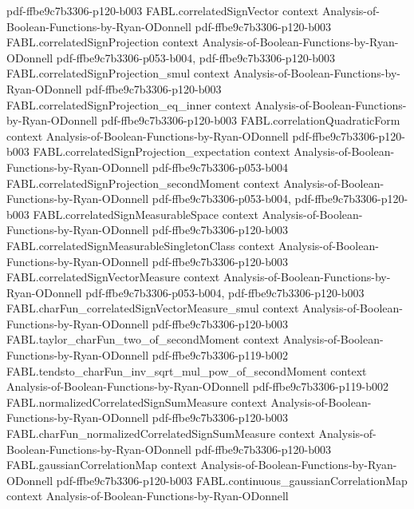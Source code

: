 \begin{theorem}
  {pdf-ffbe9c7b3306-p120-b003}
\proofstep
  {FABL.correlatedSignVector}
  {context}
  {Analysis-of-Boolean-Functions-by-Ryan-ODonnell}
  {pdf-ffbe9c7b3306-p120-b003}
\proofstep
  {FABL.correlatedSignProjection}
  {context}
  {Analysis-of-Boolean-Functions-by-Ryan-ODonnell}
  {pdf-ffbe9c7b3306-p053-b004,
    pdf-ffbe9c7b3306-p120-b003}
\proofstep
  {FABL.correlatedSignProjection_smul}
  {context}
  {Analysis-of-Boolean-Functions-by-Ryan-ODonnell}
  {pdf-ffbe9c7b3306-p120-b003}
\proofstep
  {FABL.correlatedSignProjection_eq_inner}
  {context}
  {Analysis-of-Boolean-Functions-by-Ryan-ODonnell}
  {pdf-ffbe9c7b3306-p120-b003}
\proofstep
  {FABL.correlationQuadraticForm}
  {context}
  {Analysis-of-Boolean-Functions-by-Ryan-ODonnell}
  {pdf-ffbe9c7b3306-p120-b003}
\proofstep
  {FABL.correlatedSignProjection_expectation}
  {context}
  {Analysis-of-Boolean-Functions-by-Ryan-ODonnell}
  {pdf-ffbe9c7b3306-p053-b004}
\proofstep
  {FABL.correlatedSignProjection_secondMoment}
  {context}
  {Analysis-of-Boolean-Functions-by-Ryan-ODonnell}
  {pdf-ffbe9c7b3306-p053-b004,
    pdf-ffbe9c7b3306-p120-b003}
\proofstep
  {FABL.correlatedSignMeasurableSpace}
  {context}
  {Analysis-of-Boolean-Functions-by-Ryan-ODonnell}
  {pdf-ffbe9c7b3306-p120-b003}
\proofstep
  {FABL.correlatedSignMeasurableSingletonClass}
  {context}
  {Analysis-of-Boolean-Functions-by-Ryan-ODonnell}
  {pdf-ffbe9c7b3306-p120-b003}
\proofstep
  {FABL.correlatedSignVectorMeasure}
  {context}
  {Analysis-of-Boolean-Functions-by-Ryan-ODonnell}
  {pdf-ffbe9c7b3306-p053-b004,
    pdf-ffbe9c7b3306-p120-b003}
\proofstep
  {FABL.charFun_correlatedSignVectorMeasure_smul}
  {context}
  {Analysis-of-Boolean-Functions-by-Ryan-ODonnell}
  {pdf-ffbe9c7b3306-p120-b003}
\proofstep
  {FABL.taylor_charFun_two_of_secondMoment}
  {context}
  {Analysis-of-Boolean-Functions-by-Ryan-ODonnell}
  {pdf-ffbe9c7b3306-p119-b002}
\proofstep
  {FABL.tendsto_charFun_inv_sqrt_mul_pow_of_secondMoment}
  {context}
  {Analysis-of-Boolean-Functions-by-Ryan-ODonnell}
  {pdf-ffbe9c7b3306-p119-b002}
\proofstep
  {FABL.normalizedCorrelatedSignSumMeasure}
  {context}
  {Analysis-of-Boolean-Functions-by-Ryan-ODonnell}
  {pdf-ffbe9c7b3306-p120-b003}
\proofstep
  {FABL.charFun_normalizedCorrelatedSignSumMeasure}
  {context}
  {Analysis-of-Boolean-Functions-by-Ryan-ODonnell}
  {pdf-ffbe9c7b3306-p120-b003}
\proofstep
  {FABL.gaussianCorrelationMap}
  {context}
  {Analysis-of-Boolean-Functions-by-Ryan-ODonnell}
  {pdf-ffbe9c7b3306-p120-b003}
\proofstep
  {FABL.continuous_gaussianCorrelationMap}
  {context}
  {Analysis-of-Boolean-Functions-by-Ryan-ODonnell}

\end{theorem}
